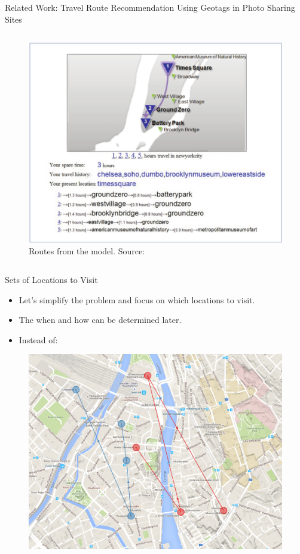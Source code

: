 \documentclass{beamer}
\begin{document}
\begin{frame}{Related Work: Travel Route Recommendation Using Geotags in Photo Sharing Sites}
\begin{columns}
    \pause
    \begin{column}{0.3\textwidth}
      \begin{figure}
        \centering
        \includegraphics[width=\textwidth]{kurashima2}
        \caption{Routes from the model. Source: \citet{Kurashima2010}}
      \end{figure}
    \end{column}
  \end{columns}
\end{frame}

\begin{frame}{Sets of Locations to Visit}
  \begin{itemize}
    \item Let's simplify the problem and focus on which locations to visit.
    \item The when and how can be determined later.
    \item Instead of:
  \end{itemize}
  \begin{figure}
    \centering
    \includegraphics[scale=0.15]{routes_1}
  \end{figure}
\end{frame}
\end{document}
